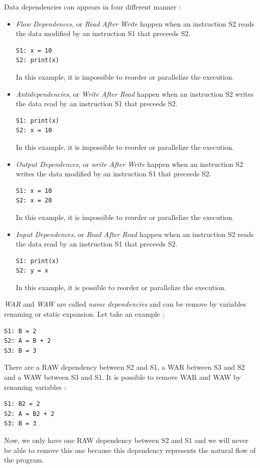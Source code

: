 Data dependencies can appears in four different manner :
\begin{itemize}
\item \emph{Flow Dependences}, or \emph{Read After Write} happen when an instruction S2 reads the data modified by an instruction S1 that preceeds S2. 
\begin{lstlisting}
S1: x = 10
S2: print(x)
\end{lstlisting}
In this example, it is impossible to reorder or parallelize the execution.

\item \emph{Antidependencies}, or \emph{Write After Read} happen when an instruction S2 writes the data read by an instruction S1 that preceeds S2.
\begin{lstlisting}
S1: print(x)
S2: x = 10
\end{lstlisting}
In this example, it is impossible to reorder or parallelize the execution.

\item \emph{Output Dependences}, or \emph{write After Write} happen when an instruction S2 writes the data modified by an instruction S1 that preceeds S2.
\begin{lstlisting}
S1: x = 10
S2: x = 20
\end{lstlisting}
In this example, it is impossible to reorder or parallelize the execution.

\item \emph{Input Dependences}, or \emph{Read After Read} happen when an instruction S2 reads the data read by an instruction S1 that preceeds S2. 
\begin{lstlisting}
S1: print(x)
S2: y = x
\end{lstlisting}
In this example, it is possible to reorder or parallelize the execution.
\end{itemize}

\emph{WAR} and \emph{WAW} are called \emph{name dependencies} and can be remove by variables renaming or static expansion. Let take an example :
\begin{lstlisting}
S1: B = 2
S2: A = B + 2
S3: B = 3
\end{lstlisting}

There are a RAW dependency between S2 and S1, a WAR between S3 and S2 and a WAW between S3 and S1. It is possible to remove WAR and WAW by renaming variables :
\begin{lstlisting}
S1: B2 = 2
S2: A = B2 + 2
S3: B = 3
\end{lstlisting}
Now, we only have one RAW dependency between S2 and S1 and we will never be able to remove this one because this dependency represents the natural flow of the program.
